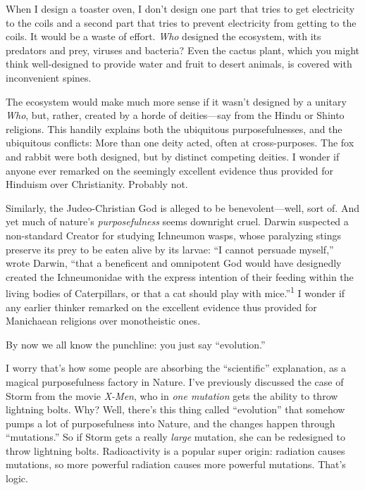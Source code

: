 {
 When I design a toaster oven, I don't design one
part that tries to get electricity to the coils and a second part that
tries to prevent electricity from getting to the coils. It would be a
waste of effort. \textit{Who} designed the ecosystem, with its
predators and prey, viruses and bacteria? Even the cactus plant, which
you might think well-designed to provide water and fruit to desert
animals, is covered with inconvenient spines.}

{
 The ecosystem would make much more sense if it
wasn't designed by a unitary \textit{Who}, but, rather,
created by a horde of deities---say from the Hindu or Shinto religions.
This handily explains both the ubiquitous purposefulnesses, and the
ubiquitous conflicts: More than one deity acted, often at
cross-purposes. The fox and rabbit were both designed, but by distinct
competing deities. I wonder if anyone ever remarked on the seemingly
excellent evidence thus provided for Hinduism over Christianity.
Probably not.}

{
 Similarly, the Judeo-Christian God is alleged to be
benevolent---well, sort of. And yet much of nature's
\textit{purposefulness} seems downright cruel. Darwin suspected a
non-standard Creator for studying Ichneumon wasps, whose paralyzing
stings preserve its prey to be eaten alive by its larvae:
``I cannot persuade myself,'' wrote
Darwin, ``that a beneficent and omnipotent God would
have designedly created the Ichneumonidae with the express intention of
their feeding within the living bodies of Caterpillars, or that a cat
should play with mice.''\textsuperscript{1} I wonder
if any earlier thinker remarked on the excellent evidence thus provided
for Manichaean religions over monotheistic ones.}

{
 By now we all know the punchline: you just say
``evolution.''}

{
 I worry that's how some people are absorbing the
``scientific'' explanation, as a
magical purposefulness factory in Nature. I've
previously discussed the case of Storm from the movie \textit{X-Men},
who in \textit{one mutation} gets the ability to throw lightning bolts.
Why? Well, there's this thing called
``evolution'' that somehow pumps a
lot of purposefulness into Nature, and the changes happen through
``mutations.'' So if Storm gets a
really \textit{large} mutation, she can be redesigned to throw
lightning bolts. Radioactivity is a popular super origin: radiation
causes mutations, so more powerful radiation causes more powerful
mutations. That's logic.}

